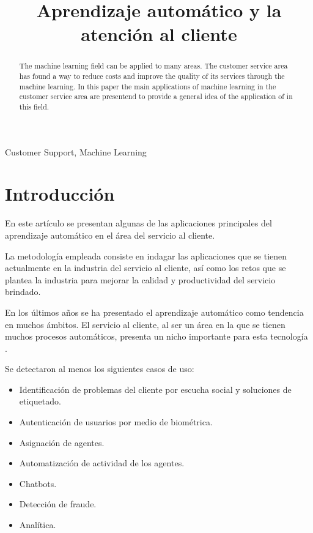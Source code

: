 \documentclass[conference]{IEEEtran}
\begin{document}
\title{Aprendizaje automático y la atención al cliente}
\author{
}

\maketitle

\begin{abstract}
The machine learning field can be applied to many areas. The customer service area has found a way to reduce costs and improve the quality of its services through the machine learning. In this paper the main applications of machine learning in the customer service area are presentend to provide a general idea of the application of in this field.
\end{abstract}

\begin{IEEEkeywords}
Customer Support, Machine Learning
\end{IEEEkeywords}

\section{Introducción}

En este artículo se presentan algunas de las aplicaciones principales del aprendizaje automático en el área del servicio al cliente.

La metodología empleada consiste en indagar las aplicaciones que se tienen actualmente en la industria del servicio al cliente, así como los retos que se plantea la industria para mejorar la calidad y productividad del servicio brindado.

En los últimos años se ha presentado el aprendizaje automático como tendencia en muchos ámbitos. El servicio al cliente, al ser un área en la que se tienen muchos procesos automáticos, presenta un nicho importante para esta tecnología \cite{11cases, hbr, airole}.

Se detectaron al menos los siguientes casos de uso:
\begin{itemize}
\item Identificación de problemas del cliente por escucha social y soluciones de etiquetado.
\item Autenticación de usuarios por medio de biométrica.
\item Asignación de agentes.
\item Automatización de actividad de los agentes.
\item Chatbots.
\item Detección de fraude.
\item Analítica.
\end{itemize}
\end{document}
